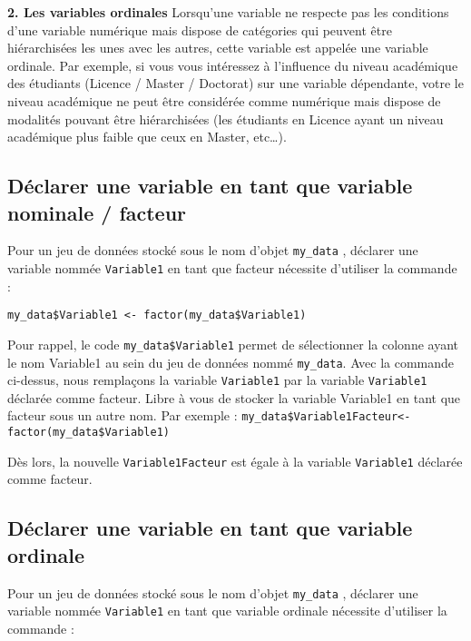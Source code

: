 \documentclass[
]{book}
\begin{document}
\textbf{2. Les variables ordinales}
Lorsqu'une variable ne respecte pas les conditions d'une variable numérique mais dispose de catégories qui peuvent être hiérarchisées les unes avec les autres, cette variable est appelée une variable ordinale. Par exemple, si vous vous intéressez à l'influence du niveau académique des étudiants (Licence / Master / Doctorat) sur une variable dépendante, votre le niveau académique ne peut être considérée comme numérique mais dispose de modalités pouvant être hiérarchisées (les étudiants en Licence ayant un niveau académique plus faible que ceux en Master, etc\ldots).

\hypertarget{duxe9clarer-une-variable-en-tant-que-variable-nominale-facteur}{%
\subsection{Déclarer une variable en tant que variable nominale / facteur}\label{duxe9clarer-une-variable-en-tant-que-variable-nominale-facteur}}

Pour un jeu de données stocké sous le nom d'objet \texttt{my\_data} , déclarer une variable nommée \texttt{Variable1} en tant que facteur nécessite d'utiliser la commande :

\texttt{my\_data\$Variable1\ \textless{}-\ factor(my\_data\$Variable1)}

Pour rappel, le code \texttt{my\_data\$Variable1} permet de sélectionner la colonne ayant le nom Variable1 au sein du jeu de données nommé \texttt{my\_data}. Avec la commande ci-dessus, nous remplaçons la variable \texttt{Variable1} par la variable \texttt{Variable1} déclarée comme facteur. Libre à vous de stocker la variable Variable1 en tant que facteur sous un autre nom.
Par exemple :
\texttt{my\_data\$Variable1Facteur\textless{}-factor(my\_data\$Variable1)}

Dès lors, la nouvelle \texttt{Variable1Facteur} est égale à la variable \texttt{Variable1} déclarée comme facteur.

\hypertarget{duxe9clarer-une-variable-en-tant-que-variable-ordinale}{%
\subsection{Déclarer une variable en tant que variable ordinale}\label{duxe9clarer-une-variable-en-tant-que-variable-ordinale}}

Pour un jeu de données stocké sous le nom d'objet \texttt{my\_data} , déclarer une variable nommée \texttt{Variable1} en tant que variable ordinale nécessite d'utiliser la commande :
\end{document}
